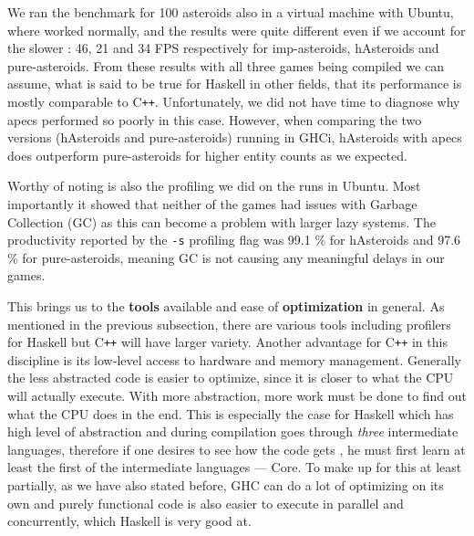 \documentclass[
  digital, %
  color,   %
  table,   %
  oneside, %
  lof,     %
  lot,     %
]{fithesis3}
\newcommand{\cpp}{C\nolinebreak\texttt{+}\nolinebreak\texttt{+}}
\begin{document}
{We ran the benchmark for 100 asteroids also in a virtual machine with Ubuntu,
where  worked normally, and the results were quite different
even if we account for the slower :
46, 21 and 34 FPS respectively for imp-asteroids, hAsteroids and pure-asteroids.
From these results with all three games being compiled we can assume,
what is said to be true for Haskell in other fields,
that its performance is mostly comparable to \cpp{}.
Unfortunately, we did not have time to diagnose why apecs performed so poorly in this case.
However, when comparing the two versions (hAsteroids and pure-asteroids) running in GHCi,
hAsteroids with apecs does outperform pure-asteroids for higher entity counts as we expected.

Worthy of noting is also the profiling we did on the runs in Ubuntu.
Most importantly it showed that neither of the games had issues with Garbage Collection (GC)
as this can become a problem with larger lazy systems.
The productivity reported by the \texttt{-s} profiling flag was 99.1 \%
for hAsteroids and 97.6 \% for pure-asteroids,
meaning GC is not causing any meaningful delays in our games.

This brings us to the \textbf{tools} available and ease of \textbf{optimization} in general.
As mentioned in the previous subsection, there are various tools including
profilers for Haskell but \cpp{} will have larger variety. Another advantage
for \cpp{} in this discipline is its low-level access to hardware and memory management.
Generally the less abstracted code is easier to optimize, since it is closer to
what the CPU will actually execute. With more abstraction, more work must be
done to find out what the CPU does in the end. This is especially the case for Haskell
which has high level of abstraction and during compilation goes through \emph{three} intermediate
languages, therefore if one desires to see how the code gets , he must
first learn at least the first of the intermediate languages --- Core.
To make up for this at least partially, as we have also stated before,
GHC can do a lot of optimizing on its own and purely functional code is also easier
to execute in parallel and concurrently, which Haskell is very good at.



}
\end{document}
